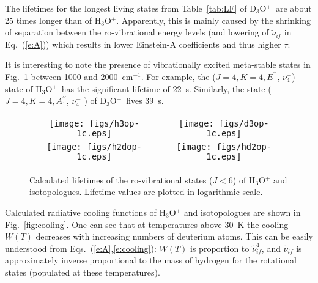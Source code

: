 \documentclass[prb,preprint,12pt,superscriptaddress,floatfix,bibnotes,nofootinbib,unsortedaddress,preprintnumbers,amsmath,amssymb]{revtex4}
\newcommand{\cm}{cm$^{-1}$}
\newcommand{\pp}{^{\prime\prime}}
\newcommand{\ohhh}{H$_3$O$^{+}$}
\newcommand{\oddd}{D$_3$O$^{+}$}
\newcommand{\2}{$_{2}$}
\newcommand{\3}{$_{3}$}
\begin{document}
The lifetimes for the longest living states from Table~\ref{tab:LF}
of \oddd\ are about 25 times longer than of \ohhh. Apparently,
this is mainly caused by the shrinking of separation between the ro-vibrational
energy levels (and lowering of $\tilde{\nu}_{if}$ in Eq.~(\ref{e:A})) which
results in lower Einstein-A coefficients and thus higher $\tau$.

It is interesting to note the presence of vibrationally excited meta-stable
states in Fig.~\ref{fig:lifetime-1} between 1000 and 2000~\cm. For example, the
($J=4, K=4, E\pp$, $\nu_4^-$)  state of \ohhh\ has the significant lifetime of
22~s. Similarly, the state ($J=4, K=4, A_1\pp$, $\nu_4^-$ ) of \oddd\ lives 39~s.






\begin{figure}[!htbp]
\begin{tabular}{cc}
  \texttt{[image: figs/h3op-1c.eps]} & \texttt{[image: figs/d3op-1c.eps]} \\

  \texttt{[image: figs/h2dop-1c.eps]}& \texttt{[image: figs/hd2op-1c.eps]}\\

\end{tabular}

  \caption{\label{fig:lifetime-1} Calculated lifetimes of the ro-vibrational states ($J<6$) of H$_3$O$^+$ and isotopologues. Lifetime values are plotted in logarithmic scale.}

\end{figure}



Calculated radiative cooling functions of H$_3$O$^+$ and isotopologues are shown
in Fig.~\ref{fig:cooling}. One can see that at  temperatures above 30~K
the cooling $W(T)$  decreases with increasing numbers of deuterium
atoms. This can be easily understood from Eqs.~(\ref{e:A},\ref{e:cooling}):
$W(T)$ is proportion to $\tilde\nu_{if}^4$, and $\tilde{\nu}_{if}$ is
approximately inverse proportional to the mass of hydrogen for the rotational
states (populated at these temperatures).
\end{document}
